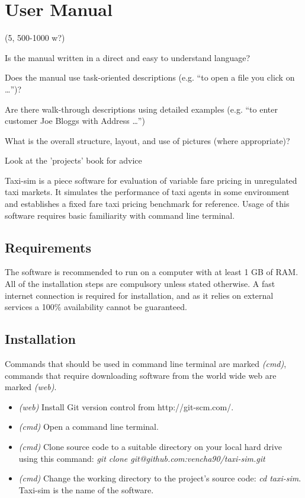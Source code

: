 \newpage
\section{User Manual}
\label{sec:user_manual}


(5, 500-1000 w?)

Is the manual written in a direct and easy to understand language?

Does the manual use task-oriented descriptions (e.g. “to open a file you click
on …”)?

Are there walk-through descriptions using detailed examples (e.g. “to enter
customer Joe Bloggs with Address …”)

What is the overall structure, layout, and use of pictures (where appropriate)?

Look at the 'projects' book for advice


Taxi-sim is a piece software for evaluation of variable fare pricing in
unregulated taxi markets. It simulates the performance of taxi agents in some
environment and establishes a fixed fare taxi pricing benchmark for reference.
Usage of this software requires basic familiarity with command line terminal.


\subsection{Requirements}

The software is recommended to run on a computer with at least 1 GB of RAM. All
of the installation steps are compulsory unless stated otherwise. A fast
internet connection is required for installation, and as it relies on external
services a 100\% availability cannot be guaranteed.


\subsection{Installation}

Commands that should be used in command line terminal are marked
\textit{(cmd)}, commands that require downloading software from the world wide
web are marked \textit{(web)}.

\begin{itemize}
  \item \textit{(web)} Install Git \parencite{Git} version control from 
        http://git-scm.com/.
  \item \textit{(cmd)} Open a command line terminal.
  \item \textit{(cmd)} Clone source code to a suitable directory on your local
        hard drive using this command: 
        \textit{git clone git@github.com:vencha90/taxi-sim.git}
  \item \textit{(cmd)} Change the working directory to the project's source
        code: \textit{cd taxi-sim}. Taxi-sim is the name of the software.
\end{itemize}

